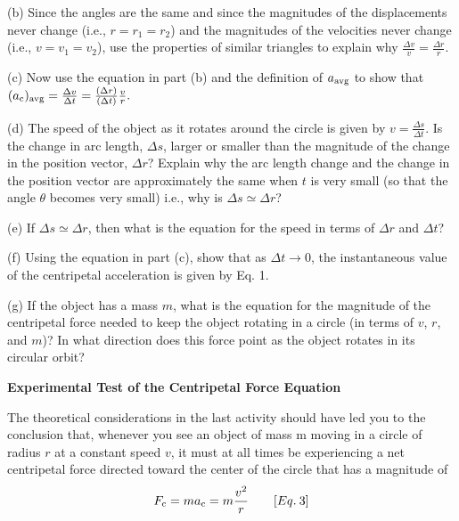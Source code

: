 (b) Since the angles are the same and since the magnitudes of the displacements
never change (i.e., \(r= r_{1}  = r_{2} \)) and the magnitudes of the
velocities never change (i.e., \(v = v_{1}  = v_{2} \)), use the properties
of similar triangles to explain why \( \frac{\Delta v}{v}=\frac{\Delta r}{r} \).
\vspace{20mm}

(c) Now use the equation in part (b) and the definition of 
$ a_{\rm avg} $ to show that
\( (a_{\rm c})_{\rm avg} =\frac{\Delta v}{\Delta t}=\frac{\left( \Delta r\right) }{\left( \Delta t\right) }\frac{v}{r}. \)
\vspace{20mm}

(d) The speed of the object as it rotates around the circle is given by \( v=\frac{\Delta s}{\Delta t} \).
Is the change in arc length, \( \Delta s \), larger or smaller than the magnitude
of the change in the position vector, \( \Delta r \)? Explain why the arc length
change and the change in the position vector are approximately the same when
$t$ is very small (so that the angle $\theta$ becomes very small) i.e., why is
\( \Delta  s
 \simeq   \Delta  r\)?
\vspace{20mm}

(e) If \( \Delta s  \simeq   \Delta  r\), then what is the equation
for the speed in terms of \( \Delta  r\) and \( \Delta  t\)?
\vspace{20mm}

(f) Using the equation in part (c), show that as \( \Delta t  \rightarrow 0 \),
the instantaneous value of the centripetal acceleration is given by Eq. 1.
\vspace{20mm}

(g) If the object has a mass $m$, what is the equation for the magnitude of the
centripetal force needed to keep the object rotating in a circle (in terms of
$v$, $r$, and $m$)? In what direction does this force point as the object rotates
in its circular orbit?
\vspace{20mm}

\textbf{Experimental Test of the Centripetal Force Equation }

The theoretical considerations in the last activity should have led you to the
conclusion that, whenever you see an object of mass m moving in a circle of
radius $r$ at a constant speed $v$, it must at all times be experiencing a net centripetal
force directed toward the center of the circle that has a magnitude of
\[
F_{\rm c}=ma_{\rm c}=m\frac{v^{2}}{r}\qquad [Eq.\: 3]\]


